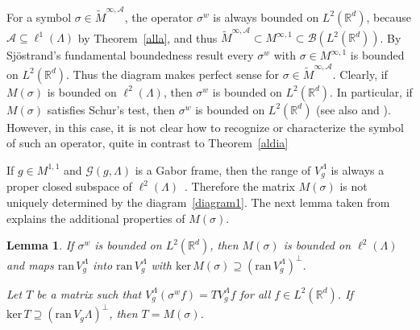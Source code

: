 \documentclass[12pt]{amsart}
\newtheorem{lemma}{Lemma}[section]
\theoremstyle{definition}
\theoremstyle{remark}
\numberwithin{equation}{section}
\newcommand{\symbo}{\widetilde M^{\infty, \cA}}
\def\cS{\mathcal{S}}
\def\cG{\mathcal{G}}
\def\cA{\mathcal{A}}
\def\bR{{\mathbb{R}}}
\def\rd{\bR^d}
\def\rdd{{\bR^{2d}}}
\def\lrd{L^2(\rd)}
\def\cS{\mathcal{S}}
\def\cG{\mathcal{G}}
\def\cA{\mathcal{A}}
\newcommand{\Cal}{\mathcal}
\newcommand{\La}{\Lambda}
\newcommand{\ac}{\Cal A}
\begin{document}
For a symbol  $\sigma\in\symbo $, the operator $\sigma ^w$ is
always bounded on $\lrd $, because $\cA \subseteq \ell ^1(\Lambda
)$ by Theorem~\ref{alla}, and thus  $\widetilde
M^{\infty,\ac}\subset M^{\infty,1}\subset \Cal B(\lrd)$. By
Sj\"ostrand's fundamental boundedness result every $\sigma ^w$
with $\sigma \in M^{\infty,1}$ is bounded on $\lrd $. Thus the
diagram makes perfect sense for $\sigma \in \symbo $.
Clearly, if $M(\sigma )$ is bounded on $\ell ^2(\Lambda )$, then
$\sigma ^w$ is bounded on $\lrd $. In particular, if $M(\sigma )$
satisfies Schur's test, then $\sigma ^w$ is bounded on $\lrd $ (see
also \cite{BC94} and 
\cite{sjo07}). However, in this case,  it is not clear  how to
recognize or characterize  the symbol of such an operator,  quite in contrast to
Theorem~\ref{aldia} 


If $g \in M^{1,1}$ and $\cG (g, \Lambda )$ is a Gabor frame, then
the range of $V_g^\Lambda $ is always a proper closed subspace of
$\ell ^2(\Lambda )$~\cite{fg97jfa}. Therefore the matrix $M(\sigma
)$ is not uniquely determined by the diagram~\eqref{diagram1}. The
next lemma taken from ~\cite{gro06} explains the additional
properties of $M(\sigma ) $.

\begin{lemma} \label{matrixprop}
  If $\sigma ^w $ is bounded on $\lrd $, then $M(\sigma )
  $ is bounded on $\ell ^2( \Lambda )$ and maps $\mathrm{ran}\, V_g^\La$
  into $\mathrm{ran}\, V_g^\La$ with $\mathrm{ker}\, M(\sigma ) \supseteq
  (\mathrm{ran}\, V_g^\La )^\perp$.

Let $T$ be a matrix such that $ V_g^\La (\sigma ^wf) =T V_g^\La f
$
for all $f\in \lrd $. If $\mathrm{ker}\, T \supseteq
(\mathrm{ran}\,
V_g\Lambda ) ^{\perp }$, then $T=M(\sigma )$.
\end{lemma}
\end{document}
